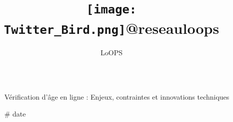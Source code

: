 \documentclass[final]{beamer}
\title{\texttt{[image: Twitter\_Bird.png]}@reseauloops}%
\author{LoOPS} %
\institute{@reseauloops} %
\newlength{\sepwid}
\newlength{\twocolwid}
\begin{document}

\setlength{\belowcaptionskip}{3ex} %
\setlength\belowdisplayshortskip{3ex} %


\begin{frame}[t] %

	\begin{columns}[t] %

		\begin{column}{\sepwid}\end{column} %

		\begin{column}{\twocolwid} %


			\begin{alertblock}{\Large{V\'{e}rification d'\^{a}ge en ligne : Enjeux, contraintes et innovations techniques}}
			\end{alertblock}

			\vspace{-2.3in}
			\begin{figure}%
				\centering
			\end{figure}

			\begin{block}{\# date}


\end{block}
\end{column}
\end{columns}
\end{frame}
\end{document}

